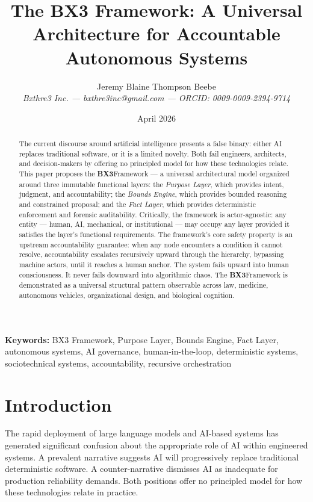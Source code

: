 \documentclass[12pt]{article}
\title{The BX3 Framework: A Universal Architecture for Accountable Autonomous Systems}
\author{Jeremy Blaine Thompson Beebe\\[0.2em]\textit{Bxthre3 Inc. --- bxthre3inc@gmail.com --- ORCID: 0009-0009-2394-9714}}
\date{April 2026}
\newcommand{\bxthree}{\textbf{BX3}}
\newcommand{\purpose}{\textit{Purpose Layer}}
\newcommand{\bounds}{\textit{Bounds Engine}}
\newcommand{\fact}{\textit{Fact Layer}}
\begin{document}
\maketitle

\begin{abstract}
\noindent
The current discourse around artificial intelligence presents a false binary: either AI replaces traditional software, or it is a limited novelty. Both fail engineers, architects, and decision-makers by offering no principled model for how these technologies relate. This paper proposes the \bxthree Framework --- a universal architectural model organized around three immutable functional layers: the \purpose, which provides intent, judgment, and accountability; the \bounds, which provides bounded reasoning and constrained proposal; and the \fact, which provides deterministic enforcement and forensic auditability. Critically, the framework is actor-agnostic: any entity --- human, AI, mechanical, or institutional --- may occupy any layer provided it satisfies the layer's functional requirements. The framework's core safety property is an upstream accountability guarantee: when any node encounters a condition it cannot resolve, accountability escalates recursively upward through the hierarchy, bypassing machine actors, until it reaches a human anchor. The system fails upward into human consciousness. It never fails downward into algorithmic chaos. The \bxthree Framework is demonstrated as a universal structural pattern observable across law, medicine, autonomous vehicles, organizational design, and biological cognition.
\end{abstract}

\medskip
\noindent\textbf{Keywords:} BX3 Framework, Purpose Layer, Bounds Engine, Fact Layer, autonomous systems, AI governance, human-in-the-loop, deterministic systems, sociotechnical systems, accountability, recursive orchestration

\newpage

\section{Introduction}
\label{sec:intro}

The rapid deployment of large language models and AI-based systems has generated significant confusion about the appropriate role of AI within engineered systems. A prevalent narrative suggests AI will progressively replace traditional deterministic software. A counter-narrative dismisses AI as inadequate for production reliability demands. Both positions offer no principled model for how these technologies relate in practice.
\end{document}
